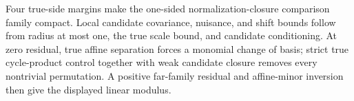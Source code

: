 Four true-side margins make the one-sided normalization-closure comparison family compact. Local candidate covariance, nuisance, and shift bounds follow from radius at most one, the true scale bound, and candidate conditioning. At zero residual, true affine separation forces a monomial change of basis; strict true cycle-product control together with weak candidate closure removes every nontrivial permutation. A positive far-family residual and affine-minor inversion then give the displayed linear modulus.